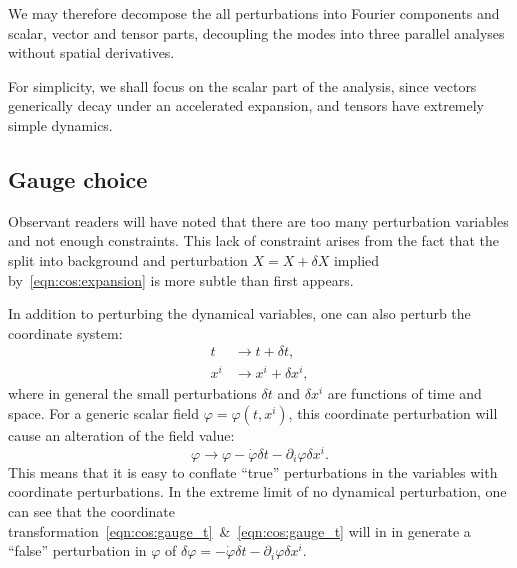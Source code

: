 We may therefore decompose the all perturbations into Fourier components and scalar, vector and tensor parts, decoupling the modes into three parallel analyses without spatial derivatives.

For simplicity, we shall focus on the scalar part of the analysis, since vectors generically decay under an accelerated expansion, and tensors have extremely simple dynamics.

\subsection{Gauge choice}
Observant readers will have noted that there are too many perturbation variables and not enough constraints.
This lack of constraint arises from the fact that the split into background and perturbation $X=X+\delta X$ implied by~\eqref{eqn:cos:expansion} is more subtle than first appears. 

In addition to perturbing the dynamical variables, one can also perturb the coordinate system:
\begin{align}
  t &\rightarrow t + \delta t,
  \label{eqn:cos:gauge_t}
  \\
  x^i &\rightarrow x^i  + \delta x^i,
  \label{eqn:cos:gauge_x}
\end{align}
where in general the small perturbations $\delta t$ and $\delta x^i$ are functions of time and space.
For a generic scalar field $\varphi = \varphi(t,x^i)$, this coordinate perturbation will cause an alteration of the field value:
\begin{equation}
  \varphi \rightarrow \varphi - \dot{\varphi}\delta t - \partial_i\varphi\delta x^i.
\end{equation}
This means that it is easy to conflate ``true'' perturbations in the variables with coordinate perturbations. In the extreme limit of no dynamical perturbation, one can see that the coordinate transformation~\eqref{eqn:cos:gauge_t}~\&~\eqref{eqn:cos:gauge_t} will in in generate a ``false'' perturbation in $\varphi$ of $\delta\varphi = -\dot{\varphi}\delta t - \partial_i\varphi\delta x^i$.

